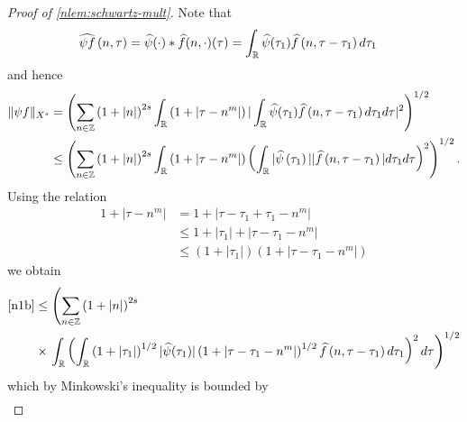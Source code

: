 %
%
\begin{proof}[Proof of \cref{nlem:schwartz-mult}]
Note that
%
%
\begin{equation*}
	\begin{split}
		\widehat{\psi f}\left( n, \tau \right)
		& = \widehat{\psi}(\cdot) * \widehat{f}(n,
		\cdot)(\tau)
		= \int_{\mathbb{R}} \widehat{\psi}(\tau_1) \widehat{f} \left( n, \tau - \tau_1 \right) 
		d\tau_1
	\end{split}
\end{equation*}
%
%
and hence
%
%
\begin{equation}
	\label{n1b}
	\begin{split}
		\|\psi f\|_{X^s} 
		& = \left( \sum_{n \in \mathbb{Z}} \left (1 + |n| \right )^{2s} \int_{\mathbb{R}} \left( 1 + | \tau -
		n^{m} | \right) | \int_{\mathbb{R}} \widehat{\psi}(\tau_1) \widehat{f}\left( n, \tau -
		\tau_1
		\right)  d \tau_1 d \tau |^2 \right)^{1/2}
		\\
		& \le \left( \sum_{n \in \mathbb{Z}} \left (1 + |n| \right )^{2s} \int_{\mathbb{R}} \left( 1 + | \tau -
		n^{m }
		|
		\right) \left( \int_{\mathbb{R}} |\widehat{\psi}\left( \tau_1 \right) | |\widehat{f}\left( n,
		\tau - \tau_1
		\right) |  d \tau_1 d \tau \right)^2 \right)^{1/2}.
	\end{split}
\end{equation}
%
%
Using the relation
%
%
\begin{equation*}
	\begin{split}
		1 + | \tau - n^{m } |
    & = 1 + | \tau - \tau_1 + \tau_{1} - n^{m} |
		\\
		& \le 1 + | \tau_1 | + | \tau - \tau_1 - n^{m} |
		\\
		& \le \left( 1 + | \tau_1 | \right)\left( 1 + | \tau - \tau_1 -
		n^{m} | \right)
	\end{split}
\end{equation*}
%
%
we obtain
%
%
\begin{equation*}
	\begin{split}
		\eqref{n1b}
		& \le \left( \sum_{n \in \mathbb{Z}} \left (1 + |n| \right )^{2s} \right.
		\\
		& \times \left . \int_{\mathbb{R}} \left(
		\int_{\mathbb{R}} \left( 1 + | \tau_1 | \right)^{1/2} | \widehat{\psi}(\tau_1) |
		\left( 1 + | \tau - \tau_1 - n^{m} | \right)^{1/2} \widehat{f}\left( n, \tau
		- \tau_1
		\right)d \tau_1
		\right)^2 d \tau \right)^{1/2}
	\end{split}
\end{equation*}
%
%
which by Minkowski's inequality is bounded by
%
%
\begin{equation}
	\label{n2b}
	\begin{split}

\end{split}
\end{equation}
\end{proof}

